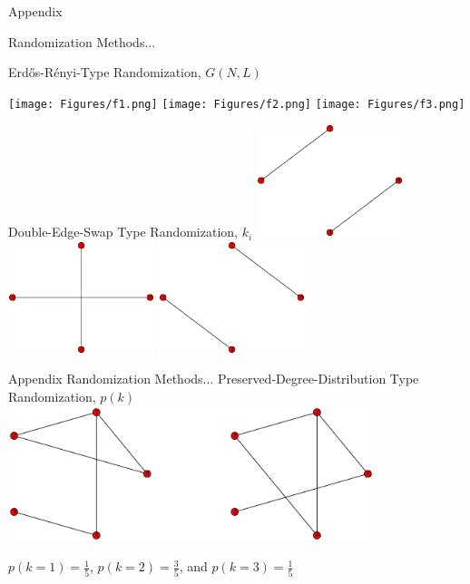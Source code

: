 \documentclass{beamer}
\begin{document}
\begin{frame}{Appendix}

Randomization Methods...

\footnotesize{Erd\H{o}s-R\'{e}nyi-Type Randomization, $G(N,L)$} 

	\texttt{[image: Figures/f1.png]}  
	\texttt{[image: Figures/f2.png]} 
    \texttt{[image: Figures/f3.png]}
    
\footnotesize{Double-Edge-Swap Type Randomization, $k_i$}
	\includegraphics[width=0.32\textwidth]{Figures/G1_swap.eps}  
    \includegraphics[width=0.32\textwidth]{Figures/G2_swap.eps}  
	\includegraphics[width=0.32\textwidth]{Figures/G3_swap.eps} 

\end{frame}



\begin{frame}{Appendix}
Randomization Methods...
\footnotesize{Preserved-Degree-Distribution Type Randomization, $p(k)$} 
	\centering	
	\includegraphics[width=0.8\textwidth]{Figures/G_degree_dist_1.eps}  

 $p(k=1)=\frac{1}{5}$, $p(k=2)=\frac{3}{5}$, and $p(k=3)=\frac{1}{5}$ 

\end{frame}
\end{document}
